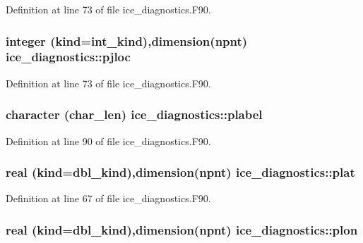 Definition at line 73 of file ice\_\-diagnostics.F90.\hypertarget{namespaceice__diagnostics_a6ba83151bf36d6683bf55801185296ca}{
\subsubsection[{pjloc}]{\setlength{\rightskip}{0pt plus 5cm}integer (kind=int\_\-kind),dimension({\bf npnt}) {\bf ice\_\-diagnostics::pjloc}}}
\label{namespaceice__diagnostics_a6ba83151bf36d6683bf55801185296ca}


Definition at line 73 of file ice\_\-diagnostics.F90.\hypertarget{namespaceice__diagnostics_a155e02068d3900d95eda6c6a3a52cb9f}{
\subsubsection[{plabel}]{\setlength{\rightskip}{0pt plus 5cm}character (char\_\-len) {\bf ice\_\-diagnostics::plabel}}}
\label{namespaceice__diagnostics_a155e02068d3900d95eda6c6a3a52cb9f}


Definition at line 90 of file ice\_\-diagnostics.F90.\hypertarget{namespaceice__diagnostics_a463e02d524db51f3b7cfe43b74753ea7}{
\subsubsection[{plat}]{\setlength{\rightskip}{0pt plus 5cm}real (kind=dbl\_\-kind),dimension({\bf npnt}) {\bf ice\_\-diagnostics::plat}}}
\label{namespaceice__diagnostics_a463e02d524db51f3b7cfe43b74753ea7}


Definition at line 67 of file ice\_\-diagnostics.F90.\hypertarget{namespaceice__diagnostics_a19e637460f07e8d9b9b9973903ec467a}{
\subsubsection[{plon}]{\setlength{\rightskip}{0pt plus 5cm}real (kind=dbl\_\-kind),dimension({\bf npnt}) {\bf ice\_\-diagnostics::plon}}}
\label{namespaceice__diagnostics_a19e637460f07e8d9b9b9973903ec467a}


